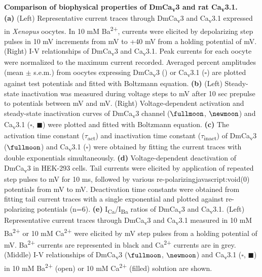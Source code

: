 \label{fig:1}

{\bf Comparison of biophysical properties of DmCa\textsubscript{v}3 and rat Ca\textsubscript{v}3.1.}\\
{\bf(a)} (Left) Representative current traces through DmCa\textsubscript{v}3 and Ca\textsubscript{v}3.1 expressed in \emph{Xenopus} oocytes. 
In 10 mM Ba\textsuperscript{2+}, currents were elicited by depolarizing step pulses in 10 mV increments from  mV to +40 mV from a holding potential of  mV. 
(Right) I-V relationships of DmCa\textsubscript{v}3 and Ca\textsubscript{v}3.1. 
Peak currents for each oocyte were normalized to the maximum current recorded. 
Averaged percent amplitudes (mean $\pm$ s.e.m.) from oocytes expressing DmCa\textsubscript{v}3 (\circle) or Ca\textsubscript{v}3.1 ($\square$) are plotted against test potentials and fitted with Boltzmann equation. 
{\bf(b)} (Left) Steady-state inactivation was measured during voltage steps to  mV after 10 sec prepulse to potentials between  mV and  mV. 
(Right) Voltage-dependent activation and steady-state inactivation curves of DmCa\textsubscript{v}3 channel ($\fullmoon$, $\newmoon$) and Ca\textsubscript{v}3.1 ($\square$, $\blacksquare$) were plotted and fitted with Boltzmann equation. 
{\bf(c)} The activation time constant ($\tau$\textsubscript{act}) and inactivation time constant ($\tau$\textsubscript{inact}) of DmCa\textsubscript{v}3 ($\fullmoon$) and Ca\textsubscript{v}3.1 ($\square$) were obtained by fitting the current traces with double exponentials simultaneously. 
{\bf(d)} Voltage-dependent deactivation of DmCa\textsubscript{v}3 in HEK-293 cells. 
Tail currents were elicited by application of repeated step pulses to  mV for 10 ms, followed by various re-polarizingjavascript:void(0) potentials from  mV to  mV. 
Deactivation time constants were obtained from fitting tail current traces with a single exponential and plotted against re-polarizing potentials (n=6). 
{\bf(e)} I\textsubscript{Ca}/I\textsubscript{Ba} ratios of DmCa\textsubscript{v}3 and Ca\textsubscript{v}3.1. 
(Left) Representative current traces through DmCa\textsubscript{v}3 and Ca\textsubscript{v}3.1 measured in 10 mM Ba\textsuperscript{2+} or 10 mM Ca\textsuperscript{2+} were elicited by  mV step pulses from a holding potential of  mV. 
Ba\textsuperscript{2+} currents are represented in black and Ca\textsuperscript{2+} currents are in grey. 
(Middle) I-V relationships of DmCa\textsubscript{v}3 ($\fullmoon$, $\newmoon$) and Ca\textsubscript{v}3.1 ($\square$, $\blacksquare$) in 10 mM Ba\textsuperscript{2+} (open) or 10 mM Ca\textsuperscript{2+} (filled) solution are shown.  
